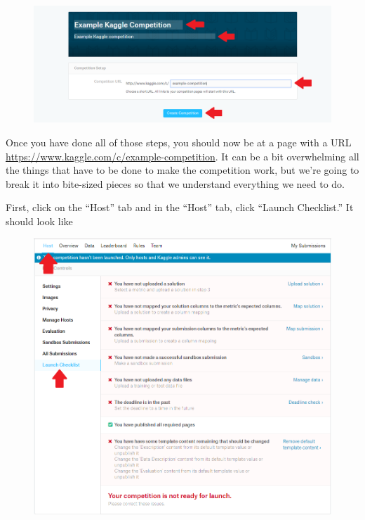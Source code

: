 \documentclass{article}
\begin{document}
\begin{figure}[H]
    \centering
    \includegraphics[width=\linewidth]{figures/start-competition.PNG}
\end{figure}

Once you have done all of those steps, you should now be at a page with
a URL \url{https://www.kaggle.com/c/example-competition}. It can be a
bit overwhelming all the things that have to be done to make the
competition work, but we're going to break it into bite-sized pieces so
that we understand everything we need to do.

First, click on the ``Host'' tab and in the ``Host'' tab, click ``Launch
Checklist.'' It should look like

\begin{figure}[H]
    \centering
    \includegraphics[width=\linewidth]{figures/launch-checklist.PNG}
\end{figure}
\end{document}
